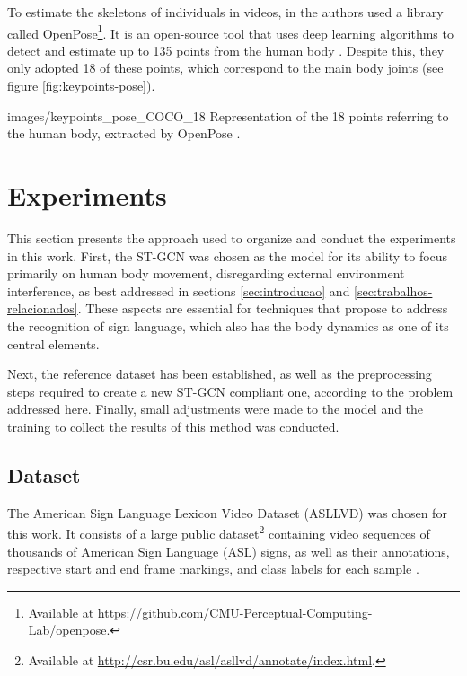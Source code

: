 To estimate the skeletons of individuals in videos, in \cite{st-gcn-2018} the authors used a library called OpenPose\footnote{
    Available at \url{https://github.com/CMU-Perceptual-Computing-Lab/openpose}.
}. It is an open-source tool that uses deep learning algorithms to detect and estimate up to 135 points from the human body \cite{cao-realtime-2017, simon-hand-2017, wei-cpm-2016}. Despite this, they only adopted 18 of these points, which correspond to the main body joints (see figure \ref{fig:keypoints-pose}).

    {images/keypoints_pose_COCO_18}
    {Representation of the 18 points referring to the human body, extracted by OpenPose \cite{openpose-output-2018}.}


\section{Experiments} 
\label{sec:experimentos}

This section presents the approach used to organize and conduct the experiments in this work. First, the ST-GCN was chosen as the model for its ability to focus primarily on human body movement, disregarding external environment interference, as best addressed in sections \ref{sec:introducao} and \ref{sec:trabalhos-relacionados}. These aspects are essential for techniques that propose to address the recognition of sign language, which also has the body dynamics as one of its central elements.

Next, the reference dataset has been established, as well as the preprocessing steps required to create a new ST-GCN compliant one, according to the problem addressed here. Finally, small adjustments were made to the model and the training to collect the results of this method was conducted.


\subsection{Dataset} 
\label{sec:dataset}

The American Sign Language Lexicon Video Dataset (ASLLVD) was chosen for this work. It consists of a large public dataset\footnote{
   Available at \url{http://csr.bu.edu/asl/asllvd/annotate/index.html}.
} containing video sequences of thousands of American Sign Language (ASL) signs, as well as their annotations, respective start and end frame markings, and class labels for each sample \cite{ athitsos-asllvd-2008, neidle-2012, vloger-2012}.

